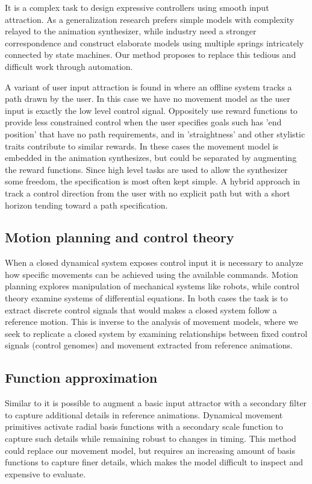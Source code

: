 It is a complex task to design expressive controllers using smooth input attraction. As a generalization research prefers simple models with complexity relayed to the animation synthesizer, while industry need a stronger correspondence and construct elaborate models using multiple springs intricately connected by state machines. Our method proposes to replace this tedious and difficult work through automation. 

A variant of user input attraction is found in \citep{treuille07} where an offline system tracks a path drawn by the user. In this case we have no movement model as the user input is exactly the low level control signal. Oppositely \citep{kovar02} use reward functions to provide less constrained control when the user specifies goals such has 'end position' that have no path requirements, and in \citep{lee18} 'straightness' and other stylistic traits contribute to similar rewards. In these cases the movement model is embedded in the animation synthesizes, but could be separated by augmenting the reward functions. Since high level tasks are used to allow the synthesizer some freedom, the specification is most often kept simple. A hybrid approach in \citep{lee10} track a control direction from the user with no explicit path but with a short horizon tending toward a path specification.

\subsection{Motion planning and control theory}
When a closed dynamical system exposes control input it is necessary to analyze how specific movements can be achieved using the available commands. Motion planning explores manipulation of mechanical systems like robots, while control theory examine systems of differential equations. In both cases the task is to extract discrete control signals that would makes a closed system follow a reference motion. This is inverse to the analysis of movement models, where we seek to replicate a closed system by examining relationships between fixed control signals (control genomes) and movement extracted from reference animations. 

\subsection{Function approximation}
Similar to \citep{startke20} it is possible to augment a basic input attractor with a secondary filter to capture additional details in reference animations. Dynamical movement primitives activate radial basis functions with a secondary scale function to capture such details while remaining robust to changes in timing. This method could replace our movement model, but requires an increasing amount of basis functions to capture finer details, which makes the model difficult to inspect and expensive to evaluate. 


